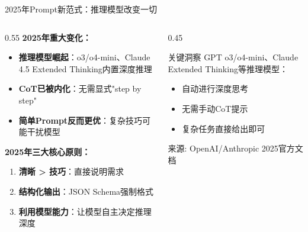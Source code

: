 \documentclass[aspectratio=169,11pt]{beamer}
\begin{document}
\begin{frame}{2025年Prompt新范式：推理模型改变一切}
    \begin{columns}
        \begin{column}{0.55\textwidth}
            \textbf{2025年重大变化：}
            \begin{itemize}
                \item \textbf{推理模型崛起}：o3/o4-mini、Claude 4.5 Extended Thinking内置深度推理
                \item \textbf{CoT已被内化}：无需显式"step by step"
                \item \textbf{简单Prompt反而更优}：复杂技巧可能干扰模型
            \end{itemize}
            
            \vspace{0.3cm}
            \textbf{2025年三大核心原则：}
            \begin{enumerate}
                \item \textbf{清晰 > 技巧}：直接说明需求
                \item \textbf{结构化输出}：JSON Schema强制格式
                \item \textbf{利用模型能力}：让模型自主决定推理深度
            \end{enumerate}
        \end{column}
        \begin{column}{0.45\textwidth}
            \begin{alertblock}{关键洞察}
                \small
                GPT o3/o4-mini、Claude Extended Thinking等推理模型：
                \begin{itemize}
                    \item 自动进行深度思考
                    \item 无需手动CoT提示
                    \item 复杂任务直接给出即可
                \end{itemize}
            \end{alertblock}
            \vspace{0.2cm}
            {\scriptsize 来源: OpenAI/Anthropic 2025官方文档}
        \end{column}
    \end{columns}
\end{frame}
\end{document}
